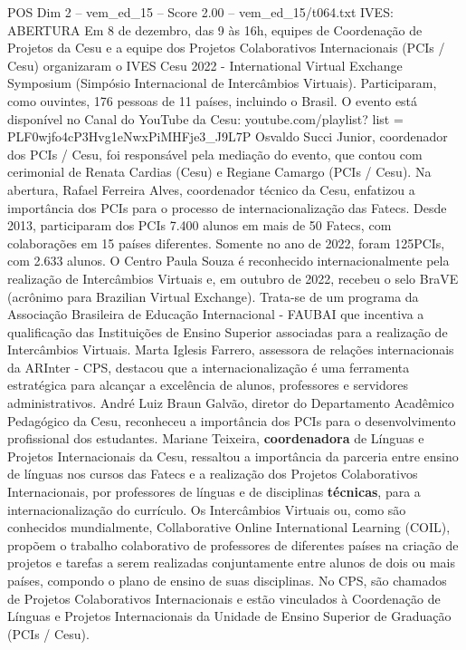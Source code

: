 \begin{textsample}{POS Dim 2 – vem\_ed\_15 – Score 2.00 – vem\_ed\_15/t064.txt}  \label{ex:f2_pos_165}
IVES: ABERTURA Em 8 de dezembro, das 9 às 16h, equipes de Coordenação de Projetos da Cesu e a equipe dos Projetos Colaborativos Internacionais (PCIs / Cesu) organizaram o IVES Cesu 2022 - International Virtual Exchange Symposium (Simpósio Internacional de Intercâmbios Virtuais).
Participaram, como ouvintes, 176 pessoas de 11 países, incluindo o Brasil.
O evento está disponível no Canal do YouTube da Cesu: youtube.com/playlist? list = PLF0wjfo4cP3Hvg1eNwxPiMHFje3\_J9L7P Osvaldo Succi Junior, coordenador dos PCIs / Cesu, foi responsável pela mediação do evento, que contou com cerimonial de Renata Cardias (Cesu) e Regiane Camargo (PCIs / Cesu).
Na abertura, Rafael Ferreira Alves, coordenador técnico da Cesu, enfatizou a importância dos PCIs para o processo de internacionalização das Fatecs.
Desde 2013, participaram dos PCIs 7.400 alunos em mais de 50 Fatecs, com colaborações em 15 países diferentes.
Somente no ano de 2022, foram 125PCIs, com 2.633 alunos.
O Centro Paula Souza é reconhecido internacionalmente pela realização de Intercâmbios Virtuais e, em outubro de 2022, recebeu o selo BraVE (acrônimo para Brazilian Virtual Exchange).
Trata-se de um programa da Associação Brasileira de Educação Internacional - FAUBAI que incentiva a qualificação das Instituições de Ensino Superior associadas para a realização de Intercâmbios Virtuais.
Marta Iglesis Farrero, assessora de relações internacionais da ARInter - CPS, destacou que a internacionalização é uma ferramenta estratégica para alcançar a excelência de alunos, professores e servidores administrativos.
André Luiz Braun Galvão, diretor do Departamento Acadêmico Pedagógico da Cesu, reconheceu a importância dos PCIs para o desenvolvimento profissional dos estudantes.
Mariane Teixeira, \textbf{coordenadora} de Línguas e Projetos Internacionais da Cesu, ressaltou a importância da parceria entre ensino de línguas nos cursos das Fatecs e a realização dos Projetos Colaborativos Internacionais, por professores de línguas e de disciplinas \textbf{técnicas}, para a internacionalização do currículo.
Os Intercâmbios Virtuais ou, como são conhecidos mundialmente, Collaborative Online International Learning (COIL), propõem o trabalho colaborativo de professores de diferentes países na criação de projetos e tarefas a serem realizadas conjuntamente entre alunos de dois ou mais países, compondo o plano de ensino de suas disciplinas.
No CPS, são chamados de Projetos Colaborativos Internacionais e estão vinculados à Coordenação de Línguas e Projetos Internacionais da Unidade de Ensino Superior de Graduação (PCIs / Cesu).

\end{textsample}

